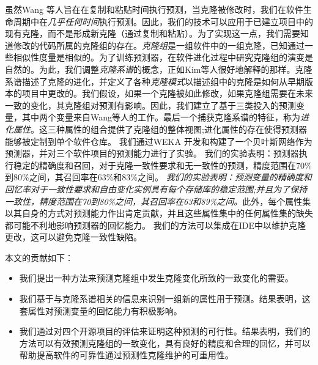 虽然Wang 等人旨在在复制和粘贴时间执行预测，当克隆被修改时，我们在软件生命周期中在{\em 几乎任何时间}执行预测。因此，我们的技术可以应用于已建立项目中的现有克隆，而不是形成新克隆（通过复制和粘贴）。为了实现这一点，我们需要知道修改的代码所属的克隆组的存在。{\em 克隆组}是一组软件中的一组克隆，已知通过一些相似性度量是相似的。为了训练预测器，在软件进化过程中研究克隆组的演变是自然的。为此，我们调整{\em 克隆系谱}的概念，正如Kim等人很好地解释的那样\cite{kim2005empirical}。克隆系谱描述了克隆的进化，并定义了各种{\em 克隆模式}以描述组中的克隆是如何从早期版本的项目中更改的。我们假设，如果一个克隆被如此修改，如果克隆组需要在未来一致的变化，其克隆组对预测有影响。因此，我们建立了基于三类投入的预测变量，其中两个变量来自Wang等人的工作。最后一个捕获克隆系谱的特征，称为{\em 进化属性}。这三种属性的组合提供了克隆组的整体视图;进化属性的存在使得预测器能够被定制到单个软件仓库。
我们通过WEKA \cite{hall2009weka}开发和构建了一个贝叶斯网络作为预测器，并对三个软件项目的预测能力进行了实验。
我们的实验表明：预测器执行稳定的精确度和召回，对于克隆一致性要求和无一致性的预测，精度范围在70\%到80\%之间，其召回率在63\%和83\%之间。 {\em {我们的实验表明：预测变量的精确度和回忆率对于一致性要求和自由变化实例具有每个存储库的稳定范围;并且为了保持一致性，精度范围在70到80\%之间，其召回率在63和89\%之间。}}此外，每个属性集以其自身的方式对预测能力作出肯定贡献，并且这些属性集中的任何属性集的缺失都可能不利地影响预测器的回忆能力。 {我们的方法可以集成在IDE中以维护克隆更改，这可以避免克隆一致性缺陷。}

本文的贡献如下：
\begin {itemize}
\item 我们提出一种方法来预测克隆组中发生克隆变化所致的一致变化的需要。
\item 我们基于与克隆系谱相关的信息来识别一组新的属性用于预测。结果表明，这套属性对预测变量的回忆能力有积极影响。
\item 我们通过对四个开源项目的评估来证明这种预测的可行性。结果表明，我们的方法可以有效预测克隆组的一致变化，具有良好的精度和合理的回忆，并可以帮助提高软件的可靠性通过预测性克隆维护的可重用性。
\end {itemize}

%


